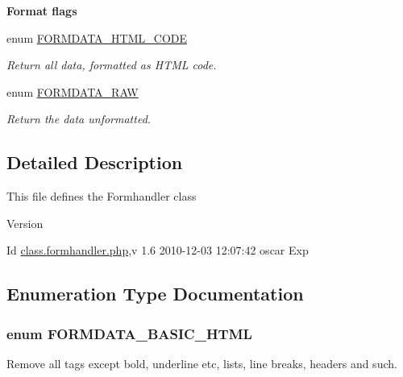 \begin{Indent}{\bf Format flags}
\begin{DoxyCompactItemize}
enum \hyperlink{class_8formhandler_8php_a73c85f0f80e1060e1adf1efb73639845}{FORMDATA\_\-HTML\_\-CODE} 
\begin{DoxyCompactList}\small\item\em Return all data, formatted as HTML code. \item\end{DoxyCompactList}\item 
enum \hyperlink{class_8formhandler_8php_a982c2cfab5717a3b68087a346cd4addd}{FORMDATA\_\-RAW} 
\begin{DoxyCompactList}\small\item\em Return the data unformatted. \item\end{DoxyCompactList}\end{DoxyCompactItemize}
\end{Indent}


\subsection{Detailed Description}
This file defines the Formhandler class \begin{DoxyVersion}{Version}

\end{DoxyVersion}
\begin{DoxyParagraph}{Id}
\hyperlink{class_8formhandler_8php}{class.formhandler.php},v 1.6 2010-\/12-\/03 12:07:42 oscar Exp 
\end{DoxyParagraph}


\subsection{Enumeration Type Documentation}
\subsubsection[{FORMDATA\_\-BASIC\_\-HTML}]{\setlength{\rightskip}{0pt plus 5cm}enum {\bf FORMDATA\_\-BASIC\_\-HTML}}\label{class_8formhandler_8php_a274bb2c8e23d075b189f143adbb6746e}


Remove all tags except bold, underline etc, lists, line breaks, headers and such. 

